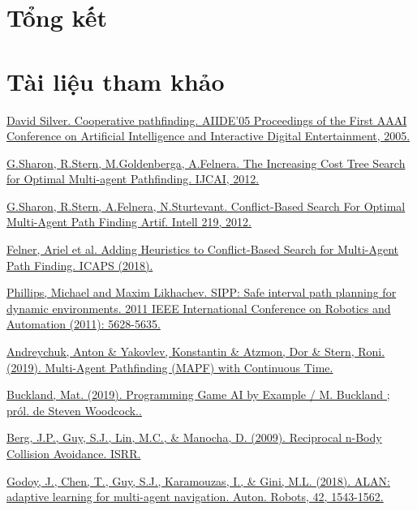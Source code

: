 \documentclass[12pt]{article}
\begin{document}
  \section{Tổng kết}
\newpage
  \section{Tài liệu tham khảo}
  {\small
    \begin{thebibliography}{5}

      \href{http://www0.cs.ucl.ac.uk/staff/d.silver/web/Publications\_files/coop-path-AIIDE.pdf}{
        David Silver. Cooperative pathfinding.
        AIIDE'05 Proceedings of the First AAAI Conference on Artificial Intelligence and Interactive Digital Entertainment, 2005.
      }

      \href{http://www.bgu.ac.il/~felner/2013/icts-aij.pdf}{
        G.Sharon, R.Stern, M.Goldenberga, A.Felnera. The Increasing Cost Tree Search for Optimal Multi-agent Pathfinding.
        IJCAI, 2012.
      }

      \href{http://www.bgu.ac.il/~felner/2013/icts-aij.pdf}{
        G.Sharon, R.Stern, A.Felnera, N.Sturtevant. Conflict-Based Search For Optimal Multi-Agent Path Finding
        Artif. Intell 219, 2012.
      }

      \href{http://www-scf.usc.edu/~hangma/pub/icaps18.pdf}{
        Felner, Ariel et al. Adding Heuristics to Conflict-Based Search for Multi-Agent Path Finding. ICAPS (2018).
      }

      \href{https://ieeexplore.ieee.org/abstract/document/5980306/}{
        Phillips, Michael and Maxim Likhachev. SIPP: Safe interval path planning for dynamic environments. 2011 IEEE International Conference on Robotics and Automation (2011): 5628-5635.
      }

      \href{https://arxiv.org/pdf/1901.05506.pdf}{
        Andreychuk, Anton \& Yakovlev, Konstantin \& Atzmon, Dor \& Stern, Roni. (2019). Multi-Agent Pathfinding (MAPF) with Continuous Time.
      }

      \href{https://www.amazon.com/Programming-Example-Wordware-Developers-Library-ebook/dp/B0029LCJXE}{
        Buckland, Mat. (2019). Programming Game AI by Example / M. Buckland ; pról. de Steven Woodcock..
      }

	\label{orcaref}
      \href{http://gamma.cs.unc.edu/ORCA/publications/ORCA.pdf}{
        Berg, J.P., Guy, S.J., Lin, M.C., \& Manocha, D. (2009). Reciprocal n-Body Collision Avoidance. ISRR.
      }

      \href{https://arxiv.org/pdf/1710.04296.pdf}{
	\label{alanref}
        Godoy, J., Chen, T., Guy, S.J., Karamouzas, I., \& Gini, M.L. (2018). ALAN: adaptive learning for multi-agent navigation. Auton. Robots, 42, 1543-1562.
      }

    \end{thebibliography}
  }
\end{document}
